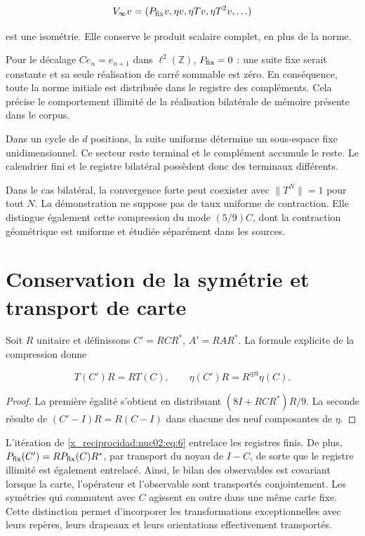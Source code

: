 \[
V_\infty v=(P_{\rm fix}v,\eta v,\eta Tv,\eta T^2v,\ldots)
\]

est une isométrie. Elle conserve le produit scalaire complet, en plus de la norme.

\begin{corollary}
Pour le décalage \(Ce_n=e_{n+1}\) dans \(\ell^2(\mathbb Z)\), \(P_{\rm fix}=0\) : une suite fixe serait constante et sa seule réalisation de carré sommable est zéro. En conséquence, toute la norme initiale est distribuée dans le registre des compléments. Cela précise le comportement illimité de la réalisation bilatérale de mémoire présente dans le corpus.
\end{corollary}

\begin{corollary}
Dans un cycle de \(d\) positions, la suite uniforme détermine un sous-espace fixe unidimensionnel. Ce secteur reste terminal et le complément accumule le reste. Le calendrier fini et le registre bilatéral possèdent donc des terminaux différents.
\end{corollary}

Dans le cas bilatéral, la convergence forte peut coexister avec \(\|T^N\|=1\) pour tout \(N\). La démonstration ne suppose pas de taux uniforme de contraction. Elle distingue également cette compression du mode \((5/9)C\), dont la contraction géométrique est uniforme et étudiée séparément dans les sources.

\section{Conservation de la symétrie et transport de carte
}

Soit \(R\) unitaire et définissons \(C'=RCR^*\), \(A'=RAR^*\). La formule explicite de la compression donne

\begin{equation}
T(C')R=RT(C),\qquad
\eta(C')R=R^{\oplus9}\eta(C).\label{x_reciprocidad:nuc02:eq:6}
\end{equation}

\begin{proof}
La première égalité s’obtient en distribuant \((8I+RCR^*)R/9\). La seconde résulte de \((C'-I)R=R(C-I)\) dans chacune des neuf composantes de \(\eta\).
\end{proof}

L’itération de \eqref{x_reciprocidad:nuc02:eq:6} entrelace les registres finis. De plus, \(P_{\rm fix}(C')=RP_{\rm fix}(C)R^*\), par transport du noyau de \(I-C\), de sorte que le registre illimité est également entrelacé. Ainsi, le bilan des observables est covariant lorsque la carte, l’opérateur et l’observable sont transportés conjointement. Les symétries qui commutent avec \(C\) agissent en outre dans une même carte fixe. Cette distinction permet d’incorporer les transformations exceptionnelles avec leurs repères, leurs drapeaux et leurs orientations effectivement transportés.

